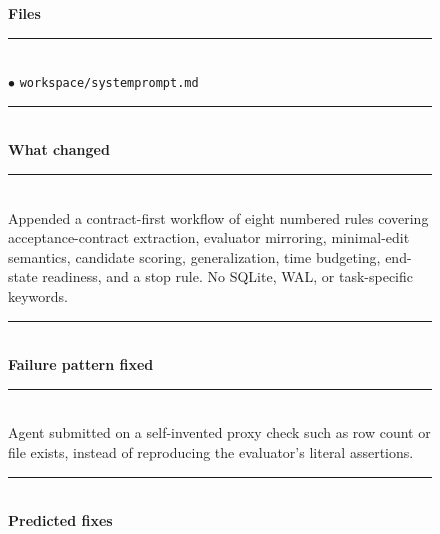 \begin{figure}[t]
    \centering
    \scriptsize
    \begin{tcbraster}[raster columns=2,
                      raster equal height,
                      raster column skip=4pt,
                      raster row skip=0pt,
                      raster left skip=0pt,
                      raster right skip=0pt,
                      boxrule=0.6pt,
                      left=4pt,right=4pt,top=3pt,bottom=3pt,
                      coltitle=white]
        \begin{tcolorbox}[colback=aheSky!18,colframe=aheNavy,colbacktitle=aheNavy,
                          title={\scriptsize\textbf{chg-1, iteration 1, commit \texttt{c0b8a05}, level: prompt}}]
            \textbf{\textcolor{aheNavy}{Files}} \\
            \rule{\linewidth}{0.3pt}\\[1pt]
            $\bullet$ \texttt{workspace/systemprompt.md} \\[3pt]
            \rule{\linewidth}{0.3pt}\\
            \textbf{\textcolor{aheNavy}{What changed}} \\
            \rule{\linewidth}{0.3pt}\\[1pt]
            Appended a contract-first workflow of eight numbered rules covering acceptance-contract extraction, evaluator mirroring, minimal-edit semantics, candidate scoring, generalization, time budgeting, end-state readiness, and a stop rule. No SQLite, WAL, or task-specific keywords. \\[3pt]
            \rule{\linewidth}{0.3pt}\\
            \textbf{\textcolor{aheNavy}{Failure pattern fixed}} \\
            \rule{\linewidth}{0.3pt}\\[1pt]
            Agent submitted on a self-invented proxy check such as row count or file exists, instead of reproducing the evaluator's literal assertions. \\[3pt]
            \rule{\linewidth}{0.3pt}\\
            \textbf{\textcolor{aheNavy}{Predicted fixes}} \\

\end{tcolorbox}
\end{tcbraster}
\end{figure}
